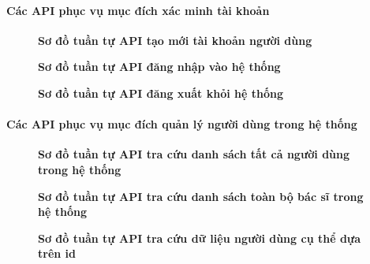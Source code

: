 \paragraph{Các API phục vụ mục đích xác minh tài khoản}
\begin{figure}[H]
	\centering
	\caption[Sơ đồ tuần tự API tạo mới tài khoản người dùng]{\bfseries \fontsize{12pt}{0pt}\selectfont Sơ đồ tuần tự API tạo mới tài khoản người dùng}
	\label{sequence_diagram_create_account}
\end{figure}

\begin{figure}[H]
	\centering
	\caption[Sơ đồ tuần tự API đăng nhập vào hệ thống]{\bfseries \fontsize{12pt}{0pt}\selectfont Sơ đồ tuần tự API đăng nhập vào hệ thống}
	\label{sequence_diagram_login}
\end{figure}

\begin{figure}[H]
	\centering
	\caption[Sơ đồ tuần tự API đăng xuất khỏi hệ thống]{\bfseries \fontsize{12pt}{0pt}\selectfont Sơ đồ tuần tự API đăng xuất khỏi hệ thống}
	\label{sequence_diagram_logout}
\end{figure}

\paragraph{Các API phục vụ mục đích quản lý người dùng trong hệ thống}
\begin{figure}[H]
	\centering
	\caption[Sơ đồ tuần tự API tra cứu danh sách tất cả người dùng trong hệ thống]{\bfseries \fontsize{12pt}{0pt}\selectfont Sơ đồ tuần tự API tra cứu danh sách tất cả người dùng trong hệ thống}
	\label{sequence_diagram_get_all_users}
\end{figure}

\begin{figure}[H]
	\centering
	\caption[Sơ đồ tuần tự API tra cứu danh sách toàn bộ bác sĩ trong hệ thống]{\bfseries \fontsize{12pt}{0pt}\selectfont Sơ đồ tuần tự API tra cứu danh sách toàn bộ bác sĩ trong hệ thống}
	\label{sequence_diagram_get_all_doctors}
\end{figure}

\begin{figure}[H]
	\centering
	\caption[Sơ đồ tuần tự API tra cứu dữ liệu người dùng cụ thể dựa trên id]{\bfseries \fontsize{12pt}{0pt}\selectfont Sơ đồ tuần tự API tra cứu dữ liệu người dùng cụ thể dựa trên id}
	\label{sequence_diagram_get_user_by_id}
\end{figure}

